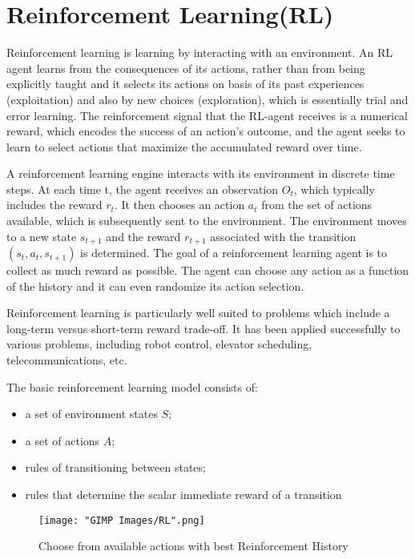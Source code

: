 \documentclass{report}
\begin{document}
\section{Reinforcement Learning(RL)}
Reinforcement learning is learning by interacting with an environment. An RL agent learns from the consequences of its actions, rather than from being explicitly taught and it selects its actions on basis of its past experiences (exploitation) and also by new choices (exploration), which is essentially trial and error learning. The reinforcement signal that the RL-agent receives is a numerical reward, which encodes the success of an action's outcome, and the agent seeks to learn to select actions that maximize the accumulated reward over time.\par
A reinforcement learning engine interacts with its environment in discrete time steps. At each time t, the agent receives an observation $O_t$, which typically includes the reward $r_t$. It then chooses an action $a_t$ from the set of actions available, which is subsequently sent to the environment. The environment moves to a new state $s_{t+1}$ and the reward $r_{t+1}$ associated with the transition $(s_t,a_t,s_{t+1})$ is determined. The goal of a reinforcement learning agent is to collect as much reward as possible. The agent can choose any action as a function of the history and it can even randomize its action selection.  \par
Reinforcement learning is particularly well suited to problems which include a long-term versus short-term reward trade-off. It has been applied successfully to various problems, including robot control, elevator scheduling, telecommunications, etc. \par
The basic reinforcement learning model consists of:
\begin{itemize}
    \item a set of environment states $S$;
    \item a set of actions $A$;
    \item rules of transitioning between states;
    \item rules that determine the scalar immediate reward of a transition
\end{itemize}

\begin{figure}[h]
  \centering
  \texttt{[image: "GIMP Images/RL".png]}
  \caption{Choose from available actions with best Reinforcement History}
  \label{fig:RL}
\end{figure}
\end{document}

